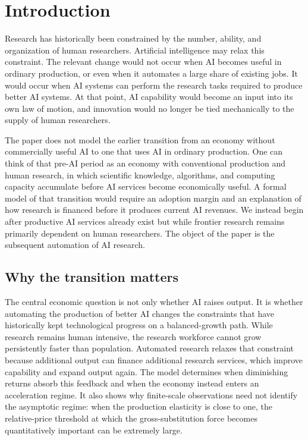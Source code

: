 \section{Introduction}
\label{sec:introduction}

Research has historically been constrained by the number, ability, and organization
of human researchers. Artificial intelligence may relax this constraint. The
relevant change would not occur when AI becomes useful in ordinary production, or
even when it automates a large share of existing jobs. It would occur when AI systems
can perform the research tasks required to produce better AI systems. At that point,
AI capability would become an input into its own law of motion, and innovation would
no longer be tied mechanically to the supply of human researchers.

The paper does not model the earlier transition from an economy without commercially
useful AI to one that uses AI in ordinary production. One can think of that
pre-AI period as an economy with conventional production and human research, in
which scientific knowledge, algorithms, and computing capacity accumulate before AI
services become economically useful. A formal model of that transition would require
an adoption margin and an explanation of how research is financed before it produces
current AI revenues. We instead begin after productive AI services already exist but
while frontier research remains primarily dependent on human researchers. The object
of the paper is the subsequent automation of AI research.

\subsection{Why the transition matters}

The central economic question is not only whether AI raises output. It is whether
automating the production of better AI changes the constraints that have historically
kept technological progress on a balanced-growth path. While research remains human
intensive, the research workforce cannot grow persistently faster than population.
Automated research relaxes that constraint because additional output can finance
additional research services, which improve capability and expand output again. The
model determines when diminishing returns absorb this feedback and when the economy
instead enters an acceleration regime. It also shows why finite-scale observations
need not identify the asymptotic regime: when the production elasticity is close to
one, the relative-price threshold at which the gross-substitution force becomes
quantitatively important can be extremely large.

